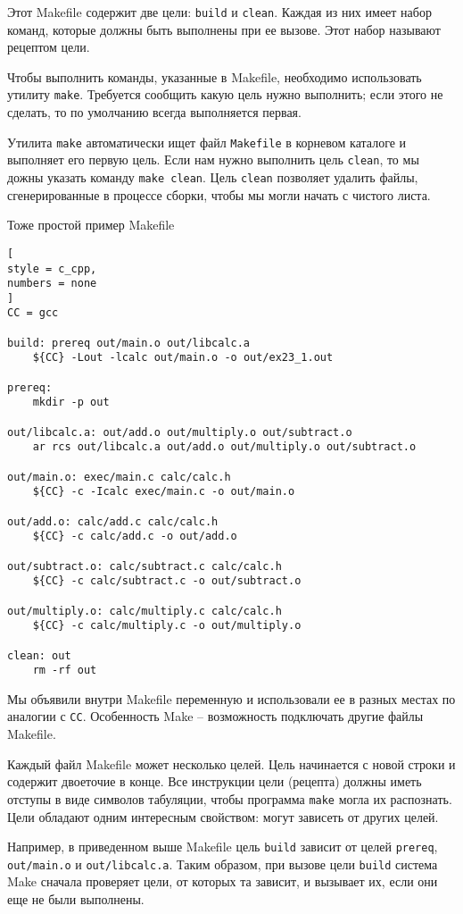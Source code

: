 \documentclass[%
	11pt,
	a4paper,
	utf8,
		]{article}
\begin{document}
Этот Makefile содержит две цели: \verb|build| и \verb|clean|. Каждая из них имеет набор команд, которые должны быть выполнены при ее вызове. Этот набор называют рецептом цели.

Чтобы выполнить команды, указанные в Makefile, необходимо использовать утилиту \verb|make|. Требуется сообщить какую цель нужно выполнить; если этого не сделать, то по умолчанию всегда выполняется первая.

Утилита \verb|make| автоматически ищет файл \verb|Makefile| в корневом каталоге и выполняет его первую цель. Если нам нужно выполнить цель \verb|clean|, то мы дожны указать команду \verb|make clean|. Цель \verb|clean| позволяет удалить файлы, сгенерированные в процессе сборки, чтобы мы могли начать с чистого листа.

Тоже простой пример Makefile
\begin{lstlisting}[
style = c_cpp,
numbers = none
]
CC = gcc

build: prereq out/main.o out/libcalc.a
    ${CC} -Lout -lcalc out/main.o -o out/ex23_1.out
    
prereq:
    mkdir -p out
    
out/libcalc.a: out/add.o out/multiply.o out/subtract.o
    ar rcs out/libcalc.a out/add.o out/multiply.o out/subtract.o
    
out/main.o: exec/main.c calc/calc.h
    ${CC} -c -Icalc exec/main.c -o out/main.o
    
out/add.o: calc/add.c calc/calc.h
    ${CC} -c calc/add.c -o out/add.o
    
out/subtract.o: calc/subtract.c calc/calc.h
    ${CC} -c calc/subtract.c -o out/subtract.o
    
out/multiply.o: calc/multiply.c calc/calc.h
    ${CC} -c calc/multiply.c -o out/multiply.o
    
clean: out
    rm -rf out
\end{lstlisting}

Мы объявили внутри Makefile переменную и использовали ее в разных местах по аналогии с \verb|CC|. Особенность Make -- возможность подключать другие файлы Makefile.

Каждый файл Makefile может несколько целей. Цель начинается с новой строки и содержит двоеточие в конце. Все инструкции цели (рецепта) должны иметь отступы в виде символов табуляции, чтобы программа \verb|make| могла их распознать. Цели обладают одним интересным свойством: могут зависеть от других целей.

Например, в приведенном выше Makefile цель \verb|build| зависит от целей \verb|prereq|, \verb|out/main.o| и \verb|out/libcalc.a|. Таким образом, при вызове цели \verb|build| система Make сначала проверяет цели, от которых та зависит, и вызывает их, если они еще не были выполнены.
\end{document}
